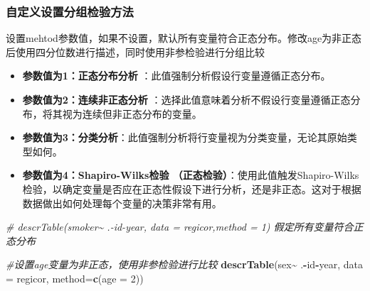 \documentclass[
]{article}
\newenvironment{Shaded}{\begin{snugshade}}{\end{snugshade}}
\newcommand{\AttributeTok}[1]{\textcolor[rgb]{0.13,0.29,0.53}{#1}}
\newcommand{\CommentTok}[1]{\textcolor[rgb]{0.56,0.35,0.01}{\textit{#1}}}
\newcommand{\DecValTok}[1]{\textcolor[rgb]{0.00,0.00,0.81}{#1}}
\newcommand{\FunctionTok}[1]{\textcolor[rgb]{0.13,0.29,0.53}{\textbf{#1}}}
\newcommand{\NormalTok}[1]{#1}
\newcommand{\SpecialCharTok}[1]{\textcolor[rgb]{0.81,0.36,0.00}{\textbf{#1}}}
\newcommand{\StringTok}[1]{\textcolor[rgb]{0.31,0.60,0.02}{#1}}
\begin{document}
\subsubsection{\texorpdfstring{\textbf{自定义设置分组检验方法}}{自定义设置分组检验方法}}\label{ux81eaux5b9aux4e49ux8bbeux7f6eux5206ux7ec4ux68c0ux9a8cux65b9ux6cd5}

设置mehtod参数值，如果不设置，默认所有变量符合正态分布。修改age为非正态后使用四分位数进行描述，同时使用非参检验进行分组比较

\begin{itemize}
\item
  \textbf{参数值为1：正态分布分析} ：此值强制分析假设行变量遵循正态分布。
\item
  \textbf{参数值为2：连续非正态分析} ：选择此值意味着分析不假设行变量遵循正态分布，将其视为连续但非正态分布的变量。
\item
  \textbf{参数值为3：分类分析}：此值强制分析将行变量视为分类变量，无论其原始类型如何。
\item
  \textbf{参数值为4：Shapiro-Wilks检验 （正态检验）}：使用此值触发Shapiro-Wilks检验，以确定变量是否应在正态性假设下进行分析，还是非正态。这对于根据数据做出如何处理每个变量的决策非常有用。
\end{itemize}

\begin{Shaded}
\begin{Highlighting}[]
\CommentTok{\# descrTable(\textasciigrave{}smoker\textasciigrave{}\textasciitilde{} .{-}id{-}year, data = regicor,method = 1) 假定所有变量符合正态分布}

\CommentTok{\#设置age变量为非正态，使用非参检验进行比较}
\FunctionTok{descrTable}\NormalTok{(}\StringTok{\textasciigrave{}}\AttributeTok{sex}\StringTok{\textasciigrave{}}\SpecialCharTok{\textasciitilde{}}\NormalTok{ .}\SpecialCharTok{{-}}\NormalTok{id}\SpecialCharTok{{-}}\NormalTok{year, }\AttributeTok{data =}\NormalTok{ regicor, }\AttributeTok{method=}\FunctionTok{c}\NormalTok{(}\AttributeTok{age =} \DecValTok{2}\NormalTok{))}
\end{Highlighting}
\end{Shaded}
\end{document}
